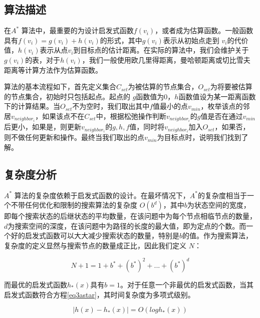 \documentclass{standalone}
\begin{document}
\subsection{算法描述}
在$A^{*}$ 算法中，最重要的为设计启发式函数$f(v_i)$，或者成为估算函数。一般函数具有$f(v_i) = g(v_i) + h(v_i)$的形式，其中$g(v_i)$表示从初始点走到 $v_i$的代价值，$h(v_i)$表示从点$v_i$到目标点的估计距离。在实际的算法中，我们会维护关于$g(v_i)$的表，对于$h(v_i)$，我们一般使用欧几里得距离，曼哈顿距离或切比雪夫距离等计算方法作为估算函数。\par
算法的基本流程如下，首先定义集合$C_{set}$为被估算的节点集合，$O_{set}$为将要被估算的节点集合，初始时只包括起点。起点的 $g$函数值为0，$h$函数值设为某一距离函数下的计算结果。当$O_{set}$不为空时，我们取出其中$f$值最小的点$v_{min}$，枚举该点的邻居$v_{neighbor_i}$，如果该点不在$C_{set}$中，根据松弛操作判断$v_{neighbor_i}$的$g$值是否在通过$v_{min}$后更小，如果是，则更新$v_{neighbor_i}$的$g, h, f$值，同时将$v_{neighbor_i}$加入$O_{set}$，如果否，则不做任何更新和操作。最终当我们取出的点$v_{min}$为目标点时，说明我们找到了解。
\subsection{复杂度分析}
$A^{*}$ 算法的复杂度依赖于启发式函数的设计。在最坏情况下，$A^{*}$的复杂度相当于一个不带任何优化和限制的搜索算法的复杂度 $O(b^d)$，其中$b$为状态空间的宽度，即每个搜索状态的后继状态的平均数量，在该问题中为每个节点相临节点的数量，$d$为搜索空间的深度，在该问题中为路径的长度的最大值，即为定点的个数。而一个好的启发式函数可以大大减少搜索状态的数量，特别是$b$的值。作为搜索算法，复杂度的定义显然与搜索节点的数量成正比，因此我们定义 $N$： 
\begin{center}
    \begin{equation}
        N + 1 = 1 + b^* + (b^*)^2 + ... + (b^*)^d
    \end{equation}
\end{center}
而最优的启发式函数$h_*(x)$具有$b=1$。对于任意一个非最优的启发式函数，当其启发式函数符合方程\ref{eq3astar}，其时间复杂度为多项式级别。
\begin{center}
    \begin{equation}
    \label{eq3astar}
        |h(x) - h_*(x)| = O(logh_*(x))
    \end{equation}
    
\end{center}
\end{document}
